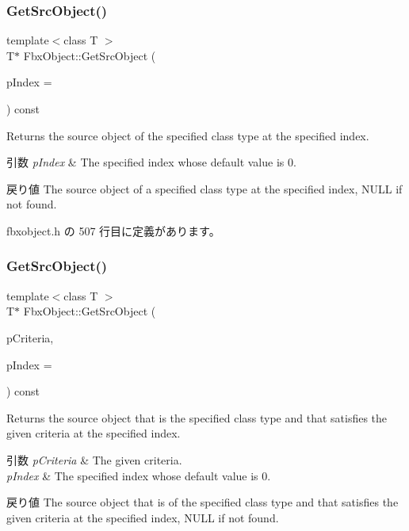 \subsubsection{\texorpdfstring{Get\+Src\+Object()}{GetSrcObject()}\hspace{0.1cm}{\footnotesize\ttfamily [3/4]}}
{\footnotesize\ttfamily template$<$class T $>$ \\
T$\ast$ Fbx\+Object\+::\+Get\+Src\+Object (\begin{DoxyParamCaption}\item[{int}]{p\+Index = {} }\end{DoxyParamCaption}) const\hspace{0.3cm}{\ttfamily [inline]}}

Returns the source object of the specified class type at the specified index. 
\begin{DoxyParams}{引数}
{\em p\+Index} & The specified index whose default value is 0. \\
\hline
\end{DoxyParams}
\begin{DoxyReturn}{戻り値}
The source object of a specified class type at the specified index, N\+U\+LL if not found. 
\end{DoxyReturn}


 fbxobject.\+h の 507 行目に定義があります。

\mbox{\label{class_fbx_object_a8a4458e4c75a797792f25ccc9a0e5ae1}} 
\subsubsection{\texorpdfstring{Get\+Src\+Object()}{GetSrcObject()}\hspace{0.1cm}{\footnotesize\ttfamily [4/4]}}
{\footnotesize\ttfamily template$<$class T $>$ \\
T$\ast$ Fbx\+Object\+::\+Get\+Src\+Object (\begin{DoxyParamCaption}\item[{const \hyperlink{class_fbx_criteria}{Fbx\+Criteria} \&}]{p\+Criteria,  }\item[{int}]{p\+Index = {} }\end{DoxyParamCaption}) const\hspace{0.3cm}{\ttfamily [inline]}}

Returns the source object that is the specified class type and that satisfies the given criteria at the specified index. 
\begin{DoxyParams}{引数}
{\em p\+Criteria} & The given criteria. \\
\hline
{\em p\+Index} & The specified index whose default value is 0. \\
\hline
\end{DoxyParams}
\begin{DoxyReturn}{戻り値}
The source object that is of the specified class type and that satisfies the given criteria at the specified index, N\+U\+LL if not found. 
\end{DoxyReturn}


